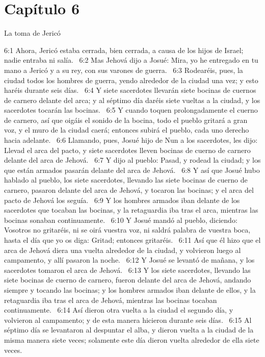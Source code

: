 \section*{Capítulo 6 }
La toma de Jericó  

6:1 Ahora, Jericó estaba cerrada, bien cerrada, a causa de los hijos de Israel; nadie entraba ni salía.  
6:2 Mas Jehová dijo a Josué: Mira, yo he entregado en tu mano a Jericó y a su rey, con sus varones de guerra.  
6:3 Rodearéis, pues, la ciudad todos los hombres de guerra, yendo alrededor de la ciudad una vez; y esto haréis durante seis días.  
6:4 Y siete sacerdotes llevarán siete bocinas de cuernos de carnero delante del arca; y al séptimo día daréis siete vueltas a la ciudad, y los sacerdotes tocarán las bocinas.  
6:5 Y cuando toquen prolongadamente el cuerno de carnero, así que oigáis el sonido de la bocina, todo el pueblo gritará a gran voz, y el muro de la ciudad caerá; entonces subirá el pueblo, cada uno derecho hacia adelante.  
6:6 Llamando, pues, Josué hijo de Nun a los sacerdotes, les dijo: Llevad el arca del pacto, y siete sacerdotes lleven bocinas de cuerno de carnero delante del arca de Jehová.  
6:7 Y dijo al pueblo: Pasad, y rodead la ciudad; y los que están armados pasarán delante del arca de Jehová.  
6:8 Y así que Josué hubo hablado al pueblo, los siete sacerdotes, llevando las siete bocinas de cuerno de carnero, pasaron delante del arca de Jehová, y tocaron las bocinas; y el arca del pacto de Jehová los seguía.  
6:9 Y los hombres armados iban delante de los sacerdotes que tocaban las bocinas, y la retaguardia iba tras el arca, mientras las bocinas sonaban continuamente.  
6:10 Y Josué mandó al pueblo, diciendo: Vosotros no gritaréis, ni se oirá vuestra voz, ni saldrá palabra de vuestra boca, hasta el día que yo os diga: Gritad; entonces gritaréis.  
6:11 Así que él hizo que el arca de Jehová diera una vuelta alrededor de la ciudad, y volvieron luego al campamento, y allí pasaron la noche.  
6:12 Y Josué se levantó de mañana, y los sacerdotes tomaron el arca de Jehová.  
6:13 Y los siete sacerdotes, llevando las siete bocinas de cuerno de carnero, fueron delante del arca de Jehová, andando siempre y tocando las bocinas; y los hombres armados iban delante de ellos, y la retaguardia iba tras el arca de Jehová, mientras las bocinas tocaban continuamente.  
6:14 Así dieron otra vuelta a la ciudad el segundo día, y volvieron al campamento; y de esta manera hicieron durante seis días.  
6:15 Al séptimo día se levantaron al despuntar el alba, y dieron vuelta a la ciudad de la misma manera siete veces; solamente este día dieron vuelta alrededor de ella siete veces.  
